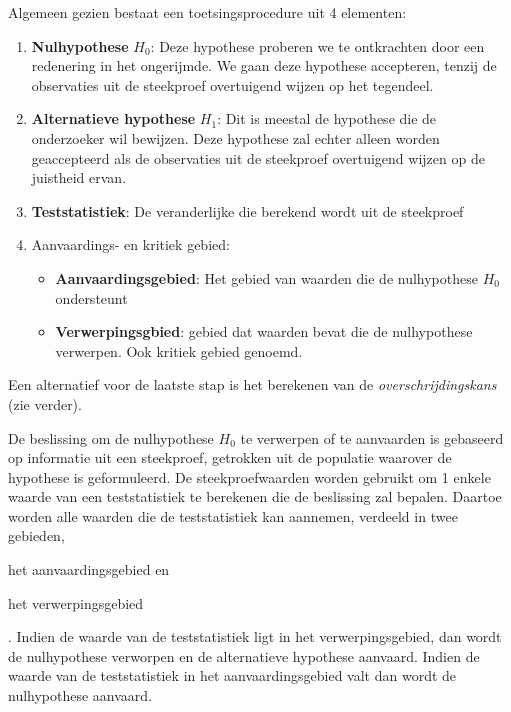 Algemeen gezien bestaat een toetsingsprocedure uit 4 elementen:
\begin{enumerate}
  \item \textbf{Nulhypothese} $H_{0}$: Deze hypothese proberen we te ontkrachten door een redenering in het ongerijmde. We gaan deze hypothese accepteren, tenzij de observaties uit de steekproef overtuigend wijzen op het tegendeel.
  \item \textbf{Alternatieve hypothese} $H_{1}$: Dit is meestal de hypothese die de onderzoeker wil bewijzen. Deze hypothese zal echter alleen worden geaccepteerd als de observaties uit de steekproef overtuigend wijzen op de juistheid ervan.
  \item \textbf{Teststatistiek}: De veranderlijke die berekend wordt uit de steekproef
  \item Aanvaardings- en kritiek gebied:
  \begin{itemize}
    \item  \textbf{Aanvaardingsgebied}: Het gebied van waarden die de nulhypothese $H_{0}$ ondersteunt
    \item \textbf{Verwerpingsgbied}: gebied dat waarden bevat die de nulhypothese verwerpen. Ook kritiek gebied genoemd.
  \end{itemize}
\end{enumerate}

Een alternatief voor de laatste stap is het berekenen van de \emph{overschrijdingskans} (zie verder).

De beslissing om de nulhypothese $H_{0}$ te verwerpen of te aanvaarden is gebaseerd op informatie uit een steekproef, getrokken uit de populatie waarover de hypothese is geformuleerd. De steekproefwaarden worden gebruikt om 1 enkele waarde van een teststatistiek te berekenen die de beslissing zal bepalen. Daartoe worden alle waarden die de teststatistiek kan aannemen, verdeeld in twee gebieden, \begin{inparaenum}[(i)] \item het aanvaardingsgebied en \item het verwerpingsgebied\end{inparaenum}. Indien de waarde van de teststatistiek ligt in het verwerpingsgebied, dan wordt de nulhypothese verworpen en de alternatieve hypothese aanvaard. Indien de waarde van de teststatistiek in het aanvaardingsgebied valt dan wordt de nulhypothese aanvaard.

